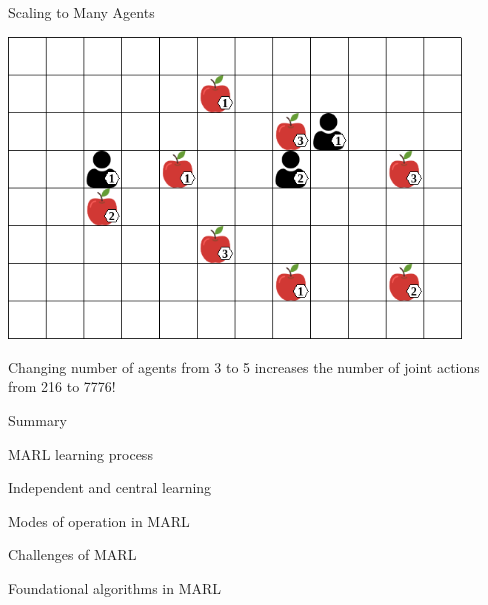 \begin{frame}{Scaling to Many Agents}
	    
	\bcol
	        \includegraphics[width=0.9\textwidth]{images/environments/lbf/foraging_8x12_b.png}
	        
	        	Changing number of agents from 3 to 5 increases the number of joint actions from 216 to 7776!
	\ecol

\end{frame}

\begin{frame}{Summary}

    \blist
        \item MARL learning process
        \item Independent and central learning
        \item Modes of operation in MARL
        \item Challenges of MARL
    \elist


    \blist
        \item Foundational algorithms in MARL
    \elist
    
\end{frame}



